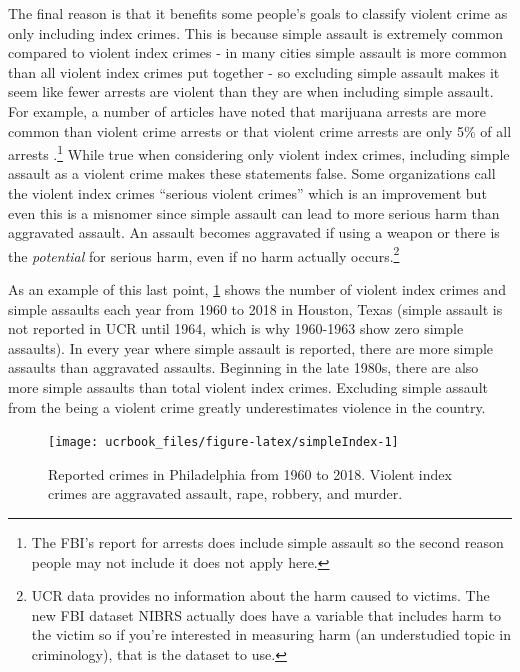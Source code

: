 \documentclass[
  12pt,
  openany]{book}
\begin{document}
The final reason is that it benefits some people's goals to classify violent crime as only including index crimes. This is because simple assault is extremely common compared to violent index crimes - in many cities simple assault is more common than all violent index crimes put together - so excluding simple assault makes it seem like fewer arrests are violent than they are when including simple assault. For example, a number of articles have noted that marijuana arrests are more common than violent crime arrests \citep{ingraham2016, kertscher2019, devito2020, earlenbaugh2020, aclu2020} or that violent crime arrests are only 5\% of all arrests \citep{neusteter2019every, speri2019}.\footnote{The FBI's report for arrests does include simple assault so the second reason people may not include it does not apply here.} While true when considering only violent index crimes, including simple assault as a violent crime makes these statements false. Some organizations call the violent index crimes ``serious violent crimes'' which is an improvement but even this is a misnomer since simple assault can lead to more serious harm than aggravated assault. An assault becomes aggravated if using a weapon or there is the \emph{potential} for serious harm, even if no harm actually occurs.\footnote{UCR data provides no information about the harm caused to victims. The new FBI dataset NIBRS actually does have a variable that includes harm to the victim so if you're interested in measuring harm (an understudied topic in criminology), that is the dataset to use.}

As an example of this last point, \ref{fig:simpleIndex} shows the number of violent index crimes and simple assaults each year from 1960 to 2018 in Houston, Texas (simple assault is not reported in UCR until 1964, which is why 1960-1963 show zero simple assaults). In every year where simple assault is reported, there are more simple assaults than aggravated assaults. Beginning in the late 1980s, there are also more simple assaults than total violent index crimes. Excluding simple assault from the being a violent crime greatly underestimates violence in the country.

\begin{figure}

{\centering \texttt{[image: ucrbook\_files/figure-latex/simpleIndex-1]} 

}

\caption{Reported crimes in Philadelphia from 1960 to 2018. Violent index crimes are aggravated assault, rape, robbery, and murder.}\label{fig:simpleIndex}
\end{figure}
\end{document}
